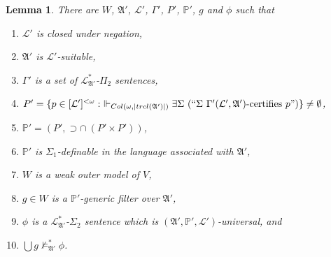 \documentclass[12pt, twoside]{memoir}
\numberwithin{equation}{section}
\newtheorem{lem}[thm]{Lemma}
\theoremstyle{definition}
\theoremstyle{remark}
\theoremstyle{definition}
\theoremstyle{definition}
\theoremstyle{definition}
\theoremstyle{remark}
\begin{document}
\begin{lem}\label{lem339}
There are $W$, $\mathfrak{A}'$, $\mathcal{L}'$, $\Gamma'$, $P'$, $\mathbb{P}'$, $g$ and $\phi$ such that
\begin{enumerate}[label=(\alph*)]
    \item\label{3391} $\mathcal{L}'$ is closed under negation,
    \item\label{3392} $\mathfrak{A}'$ is $\mathcal{L}'$-suitable,
    \item\label{3393} $\Gamma'$ is a set of $\mathcal{L}^{*}_{\mathfrak{A}'}$-$\Pi_2$ sentences,
    \item\label{3394} $P' = \{p \in [\mathcal{L}']^{< \omega} : \ \Vdash_{Col(\omega, |trcl(\mathfrak{A}')|)} \exists \Sigma \ (``\Sigma \ \Gamma'(\mathcal{L}', \mathfrak{A}') \text{-certifies } p")\} \neq \emptyset$,
    \item\label{3395} $\mathbb{P}' = (P', \supset \cap \ (P' \times P'))$, 
    \item\label{3396} $\mathbb{P}'$ is $\Sigma_1$-definable in the language associated with $\mathfrak{A}'$,
    \item\label{3397} $W$ is a weak outer model of $V$,
    \item\label{3398} $g \in W$ is a $\mathbb{P}'$-generic filter over $\mathfrak{A}'$,
    \item\label{3399} $\phi$ is a $\mathcal{L}^{*}_{\mathfrak{A}'}$-$\Sigma_2$ sentence which is $(\mathfrak{A}', \mathbb{P}', \mathcal{L}')$-universal, and
    \item\label{33910} $\bigcup g \not \models^{*}_{\mathfrak{A}'} \phi$.
\end{enumerate}
\end{lem}
\end{document}
